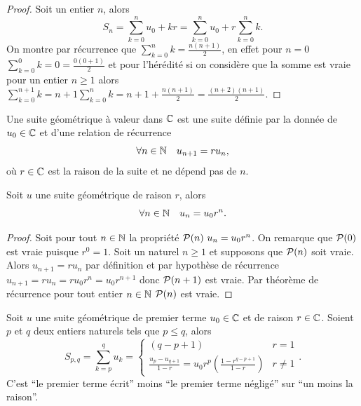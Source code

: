 \begin{proof}
  Soit un entier \(n\), alors
  \begin{equation}
    S_n = \sum_{k = 0}^n u_0 + kr= \sum_{k = 0}^n u_0 + r\sum_{k = 0}^n k.
  \end{equation}
  On montre par récurrence que \(\sum_{k = 0}^n k = \frac{n(n + 1)}{2}\), en 
  effet pour \(n = 0\) \(\sum_{k = 0}^0 k = 0 = \frac{0(0 + 1)}{2}\) et pour 
  l'hérédité si on considère que la somme est vraie pour un entier \(n \geqslant 
  1\) alors \(\sum_{k = 0}^{n + 1} k= n + 1 \sum_{k = 0}^n k = n + 1 + \frac{n(n 
  + 1)}{2} = \frac{(n + 2)(n + 1)}{2}\).
\end{proof}

\begin{defdef}
  Une suite géométrique à valeur dans \(\C\) est une suite définie par la donnée 
  de \(u_0\in\C\) et d'une relation de récurrence
  \begin{equation}
    \forall n \in \N \quad u_{n + 1} = ru_n,
  \end{equation}
  où \(r\in\C\) est la raison de la suite et ne dépend pas de \(n\).
\end{defdef}

\begin{prop}
  Soit \(u\) une suite géométrique de raison \(r\), alors
  \begin{equation}
    \forall n \in \N \quad u_n = u_0r^n.
  \end{equation}
\end{prop}

\begin{proof}
  Soit pour tout \(n\in\N\) la propriété \(\P(n)\ u_n = u_0r^n\). On remarque 
  que \(\P(0)\) est vraie puisque \(r^0 = 1\). Soit un naturel \(n\geqslant 1\) 
  et supposons que \(\P(n)\) soit vraie. Alors \(u_{n + 1} = r u_n\) par 
  définition et par hypothèse de récurrence \(u_{n + 1} = r u_n = r u_0 r^n = 
  u_0 r^{n + 1}\) donc \(\P(n + 1)\) est vraie. Par théorème de récurrence pour 
  tout entier \(n\in\N\) \(\P(n)\) est vraie.
\end{proof}

\begin{prop}
  Soit \(u\) une suite géométrique de premier terme \(u_0\in\C\) et de raison 
  \(r\in\C\). Soient \(p\) et \(q\) deux entiers naturels tels que \(p\leqslant 
  q\), alors
  \begin{equation}
    S_{p, q} = \sum_{k = p}^q u_k=
    \begin{cases}
      (q - p + 1) & r = 1 \\
      \frac{u_p - u_{q + 1}}{1 - r} = u_0r^p\left(\frac{1 - r^{q - p + 1}}{1 - 
  r}\right) & r \neq 1
\end{cases}.
\end{equation}
C'est ``le premier terme écrit'' moins ``le premier terme négligé'' sur ``un 
moins la raison''.
\end{prop}

